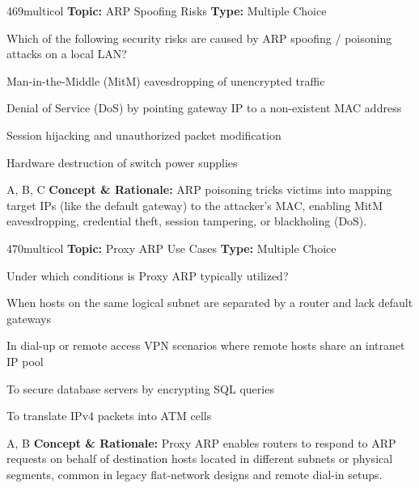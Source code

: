 \begin{qcard}{469}{multicol}
\textcolor{darkslate!75}{\small\textbf{Topic:} ARP Spoofing Risks \hfill \textbf{Type:} Multiple Choice}\vspace{0.4em}\par
Which of the following security risks are caused by ARP spoofing / poisoning attacks on a local LAN?
\begin{qoptions}
\item Man-in-the-Middle (MitM) eavesdropping of unencrypted traffic
\item Denial of Service (DoS) by pointing gateway IP to a non-existent MAC address
\item Session hijacking and unauthorized packet modification
\item Hardware destruction of switch power supplies
\end{qoptions}
\end{qcard}
\nopagebreak
\begin{explainbox}{A, B, C}
\textbf{Concept \& Rationale:} ARP poisoning tricks victims into mapping target IPs (like the default gateway) to the attacker's MAC, enabling MitM eavesdropping, credential theft, session tampering, or blackholing (DoS).
\end{explainbox}

\begin{qcard}{470}{multicol}
\textcolor{darkslate!75}{\small\textbf{Topic:} Proxy ARP Use Cases \hfill \textbf{Type:} Multiple Choice}\vspace{0.4em}\par
Under which conditions is Proxy ARP typically utilized?
\begin{qoptions}
\item When hosts on the same logical subnet are separated by a router and lack default gateways
\item In dial-up or remote access VPN scenarios where remote hosts share an intranet IP pool
\item To secure database servers by encrypting SQL queries
\item To translate IPv4 packets into ATM cells
\end{qoptions}
\end{qcard}
\nopagebreak
\begin{explainbox}{A, B}
\textbf{Concept \& Rationale:} Proxy ARP enables routers to respond to ARP requests on behalf of destination hosts located in different subnets or physical segments, common in legacy flat-network designs and remote dial-in setups.
\end{explainbox}

